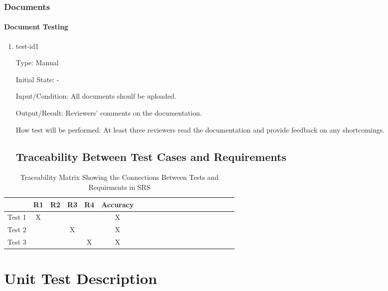\documentclass[12pt, titlepage]{article}
\begin{document}
\subsubsection{Documents}
		
\paragraph{Document Testing}

\begin{enumerate}

\item{test-id1\\}

Type: Manual
					
Initial State: -
					
Input/Condition: All documents shoulf be uploaded.
					
Output/Result: Reviewers' comments on the documentation.
					
How test will be performed:  At least three reviewers read the documentation and provide feedback on any shortcomings.

\subsection{Traceability Between Test Cases and Requirements}
\end{enumerate}
\begin{table}[h!]
\centering
\begin{tabular}{|c|c|c|c|c|c|c|c|c|c|c|c|c|c|c|c|c|c|c|c|}
\hline
	&R1 &R2 & R3 & R4 & Accuracy\\
\hline
Test 1     & X  &   &  &  & X \\ \hline
Test 2    &  &  &  X &  & X\\ \hline
Test 3     &  &  &  & X & X\\ \hline
\end{tabular}
\caption{Traceability Matrix Showing the Connections Between Tests and Requirments in SRS}
\label{Table:A_trace}
\end{table}

\section{Unit Test Description}


\end{document}
